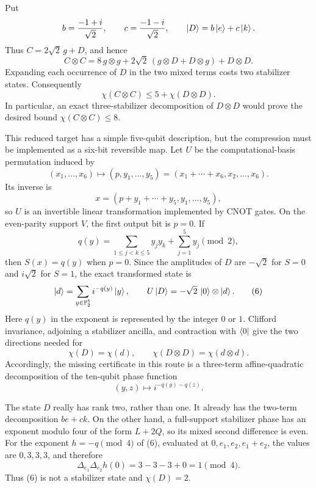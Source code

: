 \documentclass[11pt]{article}
\theoremstyle{definition}
\newcommand{\F}{\mathbb{F}}
\begin{document}
Put
\[
b=\frac{-1+i}{\sqrt2},\qquad c=\frac{-1-i}{\sqrt2},\qquad
\ket{D}=b\ket{e}+c\ket{k}.
\]
Thus $C=2\sqrt2\,g+D$, and hence
\begin{equation}
C\otimes C
=8\,g\otimes g+2\sqrt2\,(g\otimes D+D\otimes g)+D\otimes D.
\tag{3}
\end{equation}
Expanding each occurrence of $D$ in the two mixed terms costs two stabilizer states. Consequently
\begin{equation}
\boxed{\chi(C\otimes C)\leq5+\chi(D\otimes D).}
\tag{4}
\end{equation}
In particular, an exact three-stabilizer decomposition of $D\otimes D$ would prove the desired bound $\chi(C\otimes C)\leq8$.

This reduced target has a simple five-qubit description, but the compression must be implemented as a six-bit reversible map. Let $U$ be the computational-basis permutation induced by
\[
(x_1,\ldots,x_6)\longmapsto(p,y_1,\ldots,y_5)
=(x_1+\cdots+x_6,x_2,\ldots,x_6).
\]
Its inverse is
\[
x=(p+y_1+\cdots+y_5,y_1,\ldots,y_5),
\]
so $U$ is an invertible linear transformation implemented by CNOT gates. On the even-parity support $V$, the first output bit is $p=0$. If
\begin{equation}
q(y)=\sum_{1\leq j<k\leq5}y_jy_k+\sum_{j=1}^5y_j\pmod2,
\tag{5}
\end{equation}
then $S(x)=q(y)$ when $p=0$. Since the amplitudes of $D$ are $-\sqrt2$ for $S=0$ and $i\sqrt2$ for $S=1$, the exact transformed state is
\begin{equation}
\ket{d}=\sum_{y\in\F_2^5}i^{-q(y)}\ket{y},
\qquad U\ket{D}=-\sqrt2\,\ket{0}\otimes\ket{d}.
\tag{6}
\end{equation}
Here $q(y)$ in the exponent is represented by the integer $0$ or $1$. Clifford invariance, adjoining a stabilizer ancilla, and contraction with $\bra{0}$ give the two directions needed for
\[
\chi(D)=\chi(d),\qquad \chi(D\otimes D)=\chi(d\otimes d).
\]
Accordingly, the missing certificate in this route is a three-term affine-quadratic decomposition of the ten-qubit phase function
\begin{equation}
(y,z)\longmapsto i^{-q(y)-q(z)}.
\tag{7}
\end{equation}

The state $D$ really has rank two, rather than one. It already has the two-term decomposition $be+ck$. On the other hand, a full-support stabilizer phase has an exponent modulo four of the form $L+2Q$, so its mixed second difference is even. For the exponent $h=-q\pmod4$ of (6), evaluated at $0,e_1,e_2,e_1+e_2$, the values are $0,3,3,3$, and therefore
\[
\Delta_{e_1}\Delta_{e_2}h(0)=3-3-3+0=1\pmod4.
\]
Thus (6) is not a stabilizer state and $\chi(D)=2$.
\end{document}

